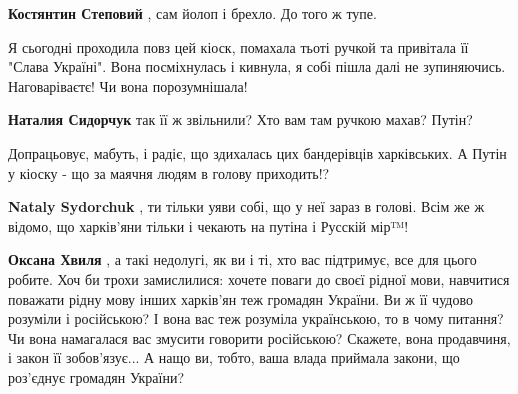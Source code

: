 \begin{itemize}
\begin{itemize}
\textbf{Костянтин Степовий} , сам йолоп і брехло. До того ж тупе.

\end{itemize}

 

Я сьогодні проходила повз цей кіоск, помахала тьоті ручкой та привітала її
"Слава Україні". Вона посміхнулась і кивнула, я собі пішла далі не зупиняючись.
Наговаріваєтє! Чи вона порозумнішала! \Smiley[1.0][yellow]

\begin{itemize}
 
\textbf{Наталия Сидорчук} так її ж звільнили? Хто вам там ручкою махав? Путін?

 
Допрацьовує, мабуть, і радіє, що здихалась цих бандерівців харківських. А Путін
у кіоску - що за маячня людям в голову приходить!?

 
\textbf{Nataly Sydorchuk} , ти тільки уяви собі, що у неї зараз в голові. Всім
же ж відомо, що харків'яни тільки і чекають на путіна і Русскій мір™!

 
\textbf{Оксана Хвиля} , а такі недолугі, як ви і ті, хто вас підтримує, все для
цього робите. Хоч би трохи замислилися: хочете поваги до своєї рідної мови,
навчитися поважати рідну мову інших харків’ян теж громадян України. Ви ж її
чудово розуміли і російською? І вона вас теж розуміла українською, то в чому
питання? Чи вона намагалася вас змусити говорити російською? Скажете, вона
продавчиня, і закон її зобов’язує... А нащо ви, тобто, ваша влада приймала
закони, що роз’єднує громадян України?


\end{itemize}
\end{itemize}
